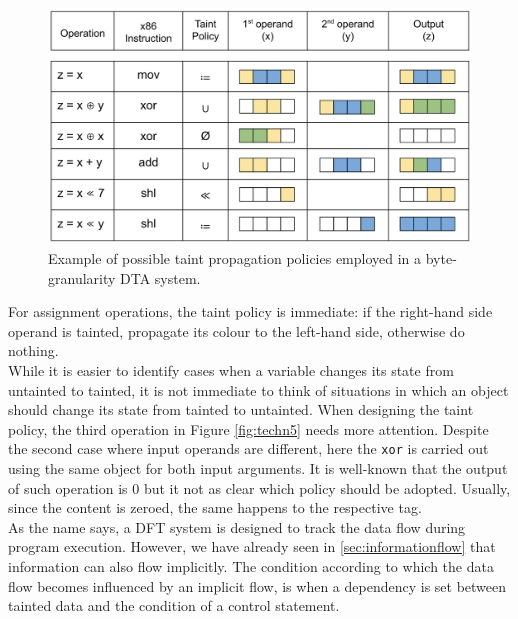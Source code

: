 \documentclass[LaM,binding=0.6cm]{sapthesis}
\begin{document}
\begin{figure}[h!]
\centering
\includegraphics[scale=.6]{images/techn5}
\caption{Example of possible taint propagation policies employed in a byte-granularity DTA system.}
\label{fig:techn5}
\end{figure}

For assignment operations, the taint policy is immediate: if the right-hand side operand is tainted, propagate its colour to the left-hand side, otherwise do nothing.\\
While it is easier to identify cases when a variable changes its state from untainted to tainted, it is not immediate to think of situations in which an object should change its state from tainted to untainted. When designing the taint policy, the third operation in Figure \autoref{fig:techn5} needs more attention. Despite the second case where input operands are different, here the \texttt{xor} is carried out using the same object for both input arguments. It is well-known that the output of such operation is $0$ but it not as clear which policy should be adopted. Usually, since the content is zeroed, the same happens to the respective tag.\\

As the name says, a DFT system is designed to track the data flow during program execution. However, we have already seen in \autoref{sec:informationflow} that information can also flow implicitly. The condition according to which the data flow becomes influenced by an implicit flow, is when a dependency is set between tainted data and the condition of a control statement.
\end{document}
